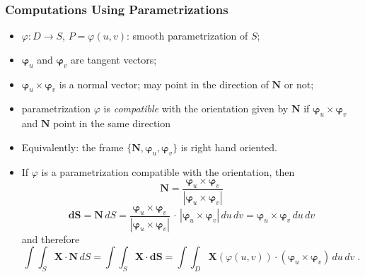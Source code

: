 \begin{frame}
\frametitle{Computations Using Parametrizations}
\begin{itemize}
\item $\varphi\colon D \to S$, $P=\varphi(u,v)$: smooth parametrization of $S$;
    \item $\bm{\varphi}_u$ and $\bm{\varphi}_v$ are tangent vectors;
    \item $\bm{\varphi}_u \times \bm{\varphi}_v$ is a normal vector; may point in the direction of $\textbf{N}$ or not;
    \item parametrization $\varphi$ is \emph{compatible} with the orientation given by $\textbf{N}$ if $\bm{\varphi}_u \times \bm{\varphi}_v$ and $\textbf{N}$ point in the same direction
    \item Equivalently:  the frame $\{ \textbf{N}, \bm{\varphi}_u, \bm{\varphi}_v\}$ is right hand oriented.
    \item If $\varphi$ is a parametrization compatible with the orientation, then
    $$\textbf{N} = \frac{\bm{\varphi}_u \times \bm{\varphi}_v}{|\bm{\varphi}_u \times \bm{\varphi}_v|}$$
$$\textbf{dS} = \textbf{N} \, dS = \frac{\bm{\varphi}_u \times \bm{\varphi}_v}{|\bm{\varphi}_u \times \bm{\varphi}_v|}  \, \cdot \,|\bm{\varphi}_u \times \bm{\varphi}_v| \, du\,dv = \bm{\varphi}_u \times \bm{\varphi}_v\, du\, dv$$
%
and therefore
%
$$\int\!\!\!\int_S \textbf{X}\cdot \textbf{N} \, dS = \int\!\!\!\int_S \textbf{X} \cdot \textbf{dS} = \int\!\!\!\int_D \textbf{X}(\varphi(u,v)) \cdot (\bm{\varphi}_u \times \bm{\varphi}_v) \, du\, dv\; .$$
\end{itemize}
\end{frame}


